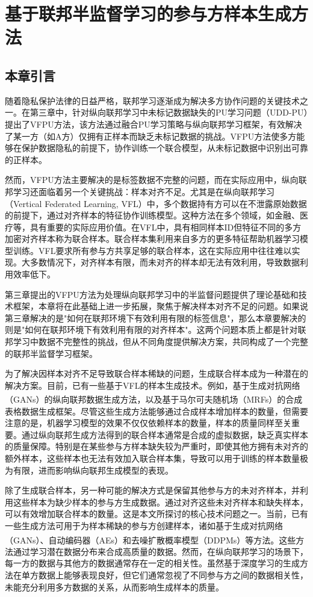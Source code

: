 \chapter{基于联邦半监督学习的参与方样本生成方法}
\thispagestyle{others}
\pagestyle{others}
\xiaosi

\section{本章引言}
随着隐私保护法律的日益严格，联邦学习逐渐成为解决多方协作问题的关键技术之一。在第三章中，针对纵向联邦学习中未标记数据缺失的PU学习问题（UDD-PU）提出了VFPU方法，该方法通过融合PU学习策略与纵向联邦学习框架，有效解决了某一方（如A方）仅拥有正样本而缺乏未标记数据的挑战。VFPU方法使多方能够在保护数据隐私的前提下，协作训练一个联合模型，从未标记数据中识别出可靠的正样本。

然而，VFPU方法主要解决的是标签数据不完整的问题，而在实际应用中，纵向联邦学习还面临着另一个关键挑战：样本对齐不足。尤其是在纵向联邦学习（Vertical Federated Learning, VFL）中，多个数据持有方可以在不泄露原始数据的前提下，通过对齐样本的特征协作训练模型。这种方法在多个领域，如金融、医疗等，具有重要的实际应用价值。在VFL中，具有相同样本ID但特征不同的多方加密对齐样本称为联合样本。联合样本集利用来自多方的更多特征帮助机器学习模型训练。VFL要求所有参与方共享足够的联合样本，这在实际应用中往往难以实现。大多数情况下，对齐样本有限，而未对齐的样本却无法有效利用，导致数据利用效率低下。

第三章提出的VFPU方法为处理纵向联邦学习中的半监督问题提供了理论基础和技术框架，本章将在此基础上进一步拓展，聚焦于解决样本对齐不足的问题。如果说第三章解决的是"如何在联邦环境下有效利用有限的标签信息"，那么本章要解决的则是"如何在联邦环境下有效利用有限的对齐样本"。这两个问题本质上都是针对联邦学习中数据不完整性的挑战，但从不同角度提供解决方案，共同构成了一个完整的联邦半监督学习框架。

为了解决因样本对齐不足导致联合样本稀缺的问题，生成联合样本成为一种潜在的解决方案。目前，已有一些基于VFL的样本生成技术。例如，基于生成对抗网络（GANs）的纵向联邦数据生成方法，以及基于马尔可夫随机场（MRFs）\textsuperscript{\cite{MRFs}}的合成表格数据生成框架。尽管这些生成方法能够通过合成样本增加样本的数量，但需要注意的是，机器学习模型的效果不仅仅依赖样本的数量，样本的质量同样至关重要。通过纵向联邦生成方法得到的联合样本通常是合成的虚拟数据，缺乏真实样本的质量保障。特别是在某些参与方样本缺失较为严重时，即使其他方拥有未对齐的额外样本，这些样本也无法有效加入联合样本集，导致可以用于训练的样本数量极为有限，进而影响纵向联邦生成模型的表现。

除了生成联合样本，另一种可能的解决方式是保留其他参与方的未对齐样本，并利用这些样本为缺少样本的参与方生成数据。通过对齐这些未对齐样本和缺失样本，可以有效增加联合样本的数量。这是本文所探讨的核心技术问题之一。当前，已有一些生成方法可用于为样本稀缺的参与方创建样本，诸如基于生成对抗网络（GANs）、自动编码器（AEs）和去噪扩散概率模型（DDPMs）\textsuperscript{\cite{TabDDPM}}等方法。这些方法通过学习潜在数据分布来合成高质量的数据。然而，在纵向联邦学习的场景下，每一方的数据与其他方的数据通常存在一定的相关性。虽然基于深度学习的生成方法在单方数据上能够表现良好，但它们通常忽视了不同参与方之间的数据相关性，未能充分利用多方数据的关系，从而影响生成样本的质量。

